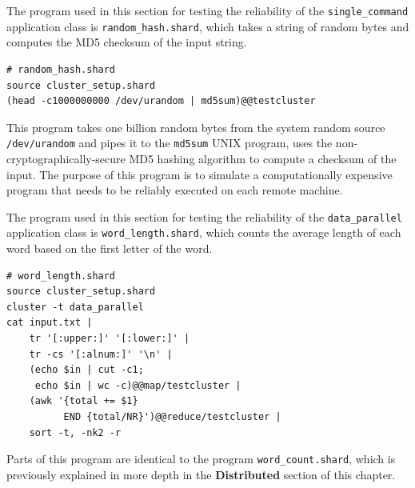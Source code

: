 \documentclass[twoside]{report}
\begin{document}
The program used in this section for testing the reliability of the \texttt{single\_command} application class is \texttt{random\_hash.shard}, which takes a string of random bytes and computes the MD5 checksum of the input string.
\begin{lstlisting}[language=Shard]
# random_hash.shard
source cluster_setup.shard
(head -c1000000000 /dev/urandom | md5sum)@@testcluster
\end{lstlisting}

This program takes one billion random bytes from the system random source \texttt{/dev/urandom} and pipes it to the \texttt{md5sum} UNIX program, uses the non-cryptographically-secure MD5 hashing algorithm to compute a checksum of the input.
The purpose of this program is to simulate a computationally expensive program that needs to be reliably executed on each remote machine.

\begin{sloppypar}
  The program used in this section for testing the reliability of the \texttt{data\_parallel} application class is \texttt{word\_length.shard}, which counts the average length of each word based on the first letter of the word.
\end{sloppypar}
\begin{lstlisting}[language=Shard]
# word_length.shard
source cluster_setup.shard
cluster -t data_parallel
cat input.txt |
    tr '[:upper:]' '[:lower:]' |
    tr -cs '[:alnum:]' '\n' |
    (echo $in | cut -c1;
     echo $in | wc -c)@@map/testcluster |
    (awk '{total += $1}
          END {total/NR}')@@reduce/testcluster |
    sort -t, -nk2 -r
\end{lstlisting}

Parts of this program are identical to the program \texttt{word\_count.shard}, which is previously explained in more depth in the \textbf{Distributed} section of this chapter.
\end{document}
